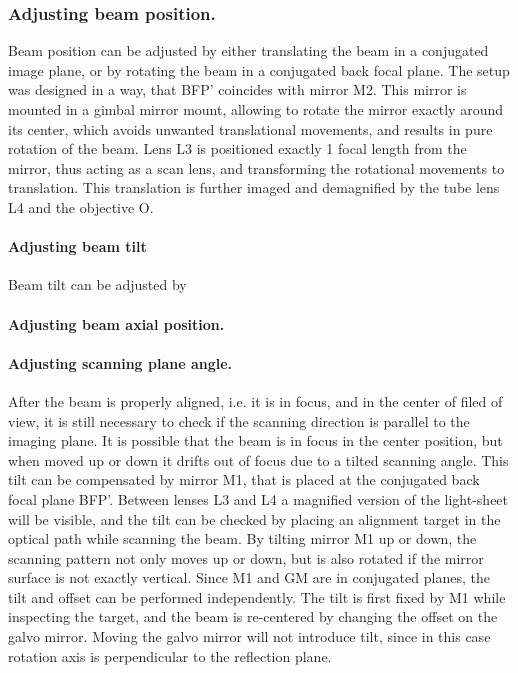     \subsubsection{Adjusting beam position.}
      Beam position can be adjusted by either translating the beam in a conjugated image plane, or by rotating the beam in a conjugated back focal plane. The setup was designed in a way, that BFP' coincides with mirror M2. This mirror is mounted in a gimbal mirror mount, allowing to rotate the mirror exactly around its center, which avoids unwanted translational movements, and results in pure rotation of the beam. Lens L3 is positioned exactly 1 focal length from the mirror, thus acting as a scan lens, and transforming the rotational movements to translation. This translation is further imaged and demagnified by the tube lens L4 and the objective O.


    \paragraph{Adjusting beam tilt}
      Beam tilt can be adjusted by 



    \paragraph{Adjusting beam axial position.}


    \paragraph{Adjusting scanning plane angle.}
      After the beam is properly aligned, i.e. it is in focus, and in the center of filed of view, it is still necessary to check if the scanning direction is parallel to the imaging plane. It is possible that the beam is in focus in the center position, but when moved up or down it drifts out of focus due to a tilted scanning angle. This tilt can be compensated by mirror M1, that is placed at the conjugated back focal plane BFP'. Between lenses L3 and L4 a magnified version of the light-sheet will be visible, and the tilt can be checked by placing an alignment target in the optical path while scanning the beam. By tilting mirror M1 up or down, the scanning pattern not only moves up or down, but is also rotated if the mirror surface is not exactly vertical. Since M1 and GM are in conjugated planes, the tilt and offset can be performed independently. The tilt is first fixed by M1 while inspecting the target, and the beam is re-centered by changing the offset on the galvo mirror. Moving the galvo mirror will not introduce tilt, since in this case rotation axis is perpendicular to the reflection plane.





